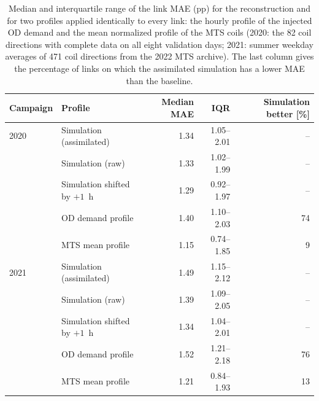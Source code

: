 \begin{table}[htbp]
\centering
\caption{Median and interquartile range of the link MAE (pp) for the reconstruction and for two profiles applied identically to every link: the hourly profile of the injected OD demand and the mean normalized profile of the MTS coils (2020: the 82 coil directions with complete data on all eight validation days; 2021: summer weekday averages of 471 coil directions from the 2022 MTS archive). The last column gives the percentage of links on which the assimilated simulation has a lower MAE than the baseline.}
\label{tab:baselines}
\begin{tabular}{@{}llrrr@{}}
\toprule
Campaign & Profile & Median MAE & IQR & Simulation better [\%] \\
\midrule
2020 & Simulation (assimilated) & 1.34 & 1.05--2.01 & -- \\
 & Simulation (raw) & 1.33 & 1.02--1.99 & -- \\
 & Simulation shifted by $+1$~h & 1.29 & 0.92--1.97 & -- \\
 & OD demand profile & 1.40 & 1.10--2.03 & 74 \\
 & MTS mean profile & 1.15 & 0.74--1.85 & 9 \\
\midrule
2021 & Simulation (assimilated) & 1.49 & 1.15--2.12 & -- \\
 & Simulation (raw) & 1.39 & 1.09--2.05 & -- \\
 & Simulation shifted by $+1$~h & 1.34 & 1.04--2.01 & -- \\
 & OD demand profile & 1.52 & 1.21--2.18 & 76 \\
 & MTS mean profile & 1.21 & 0.84--1.93 & 13 \\
\bottomrule
\end{tabular}
\end{table}
